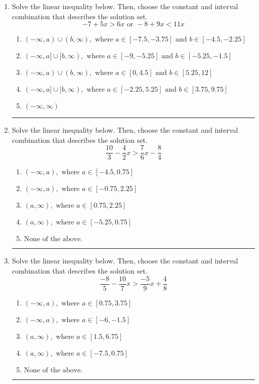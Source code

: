 \documentclass[14pt]{extbook}
\newcommand{\litem}[1]{\item#1\hspace*{-1cm}\rule{\textwidth}{0.4pt}}
\begin{document}
\begin{enumerate}
{\begin{enumerate}[label=\Alph*.]
\end{enumerate} }
\litem{
Solve the linear inequality below. Then, choose the constant and interval combination that describes the solution set.\[ -7 + 5 x > 6 x \text{ or } -8 + 9 x < 11 x \]\begin{enumerate}[label=\Alph*.]
\item \( (-\infty, a) \cup (b, \infty), \text{ where } a \in [-7.5, -3.75] \text{ and } b \in [-4.5, -2.25] \)
\item \( (-\infty, a] \cup [b, \infty), \text{ where } a \in [-9, -5.25] \text{ and } b \in [-5.25, -1.5] \)
\item \( (-\infty, a) \cup (b, \infty), \text{ where } a \in [0, 4.5] \text{ and } b \in [5.25, 12] \)
\item \( (-\infty, a] \cup [b, \infty), \text{ where } a \in [-2.25, 5.25] \text{ and } b \in [3.75, 9.75] \)
\item \( (-\infty, \infty) \)

\end{enumerate} }
\litem{
Solve the linear inequality below. Then, choose the constant and interval combination that describes the solution set.\[ \frac{10}{3} - \frac{4}{2} x > \frac{7}{6} x - \frac{8}{4} \]\begin{enumerate}[label=\Alph*.]
\item \( (-\infty, a), \text{ where } a \in [-4.5, 0.75] \)
\item \( (-\infty, a), \text{ where } a \in [-0.75, 2.25] \)
\item \( (a, \infty), \text{ where } a \in [0.75, 2.25] \)
\item \( (a, \infty), \text{ where } a \in [-5.25, 0.75] \)
\item \( \text{None of the above}. \)

\end{enumerate} }
\litem{
Solve the linear inequality below. Then, choose the constant and interval combination that describes the solution set.\[ \frac{-8}{5} - \frac{10}{7} x > \frac{-5}{9} x + \frac{4}{8} \]\begin{enumerate}[label=\Alph*.]
\item \( (-\infty, a), \text{ where } a \in [0.75, 3.75] \)
\item \( (-\infty, a), \text{ where } a \in [-6, -1.5] \)
\item \( (a, \infty), \text{ where } a \in [1.5, 6.75] \)
\item \( (a, \infty), \text{ where } a \in [-7.5, 0.75] \)
\item \( \text{None of the above}. \)


\end{enumerate}}
\end{enumerate}
\end{document}
